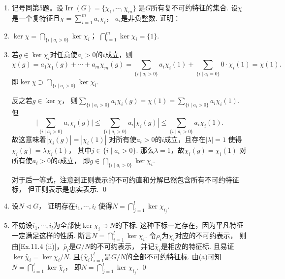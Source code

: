 \begin{enumerate}
    \item[11.6] 记号同第5题。设$\operatorname{Irr}(G) = \{\chi_{1},\cdots,\chi_{m}\}$
        是$G$所有复不可约特征的集合.
        设$\chi$是一个复特征且$\chi = \sum\limits_{i=1}^{m}a_{i}\chi_{i}$，
        $a_i$是非负整数. 证明：
    \item[(i)] $\ker \chi = \bigcap\limits_{\{i \mid a_{i}>0\}}\ker\chi_{i}$；
        $\bigcap\limits_{i = 1}^{m}\ker\chi_{i} = \{1\}$.
    \item[\textbf{证明:}]
        若$g \in \ker\chi_{i}$对任意使$a_{i} > 0$的$i$成立，则
        \[\chi(g) = a_{1}\chi_{1}(g)+\cdots+a_{m}\chi_{m}(g)  
        = \sum\limits_{\{i \mid a_{i}>0\}}a_{i}\chi_{i}(1) 
        + \sum\limits_{\{i \mid a_{i}=0\}}0 \cdot \chi_{i}(1)
        = \chi(1).\]
        即$\ker \chi \supset \bigcap\limits_{\{i \mid a_{i}>0\}}\ker\chi_{i}$.

        反之若$g \in \ker \chi$，
        则$\sum\limits_{\{i \mid a_{i}>0\}}a_{i}\chi_{i}(g) 
        = \chi(1) = \sum\limits_{\{i \mid a_{i}>0\}}a_{i}\chi_{i}(1)$.
        但
        \[\bigg|\sum\limits_{\{i \mid a_{i}>0\}}a_{i}\chi_{i}(g)\bigg|
        \leq \sum\limits_{\{i \mid a_{i}>0\}}a_{i}|\chi_{i}(g)|
        \leq \sum\limits_{\{i \mid a_{i}>0\}}a_{i}\chi_{i}(1).\]
        故这意味着$|\chi_{i}(g)|=|\chi_{i}(1)|$
        对所有使$a_{i} > 0$的$i$成立，且存在$|\lambda|=1$
        使得$\chi_{i}(g)=\lambda\chi_{i}(1)$，
        其中$j \in \{i \mid a_{i}>0\}$.
        那么$\lambda = 1$，故$\chi_{i}(g)=\chi_{i}(1)$
        对所有使$a_{i} > 0$的$i$成立，
        即$g \in \bigcap\limits_{\{i \mid a_{i}>0\}}\ker\chi_{i}$.
        
        对于后一等式，注意到正则表示的不可约直和分解已然包含所有不可约特征标，
        但正则表示是忠实表示. \qed

    \item[(ii)] 设$N \lhd G$，
        证明存在$i_{1},\cdots,i_{l}$
        使得$N = \bigcap\limits_{j=1}^{l} \ker \chi_{i_{j}}$.
    \item[\textbf{证明:}]
        不妨设$i_{1},\cdots,i_{l}$为全部使$\ker\chi_{i} \supset N$的下标.
        这种下标一定存在，因为平凡特征一定满足这样的性质.
        断言$N = \bigcap\limits_{i=1}^{l}\ker\chi_{i}$.
        令$\rho_{i}$为$\chi_{i}$对应的不可约表示，
        则由[Ex.11.4 (ii)]，$\widetilde{\rho_{i}}$是$G/N$的不可约表示，
        并记$\widetilde{\chi_{i}}$是相应的特征标.
        且易证$\ker \widetilde{\chi_{i}} = \ker \chi_{i} /N$.
        且$\{\widetilde{\chi_{i}}\}_{i=1}^{l}$是$G/N$的全部不可约特征标.
        由(a)可知${N} = \bigcap\limits_{i=1}^{l}\ker\widetilde{\chi_{i}}$，
        即$N = \bigcap\limits_{j=1}^{l} \ker \chi_{i_{j}}$. \qed


\end{enumerate}
